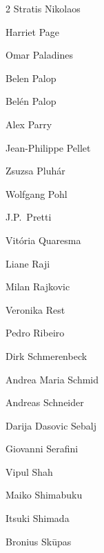 \begin{multicols}{2}
 \ifdefined\AuthorNikolaosStratis {} Stratis Nikolaos\fi
 
 \ifdefined\AuthorPageHarriet {} Harriet Page\fi
 
 \ifdefined\AuthorPaladinesOmar {} Omar Paladines\fi
 
 \ifdefined\AuthorPalopBelen {} Belen Palop\fi
 
 \ifdefined\AuthorPalopBelen {} Belén Palop\fi
 
 \ifdefined\AuthorParryAlex {} Alex Parry\fi
 
 \ifdefined\AuthorPelletJeanPhilippe {} Jean-Philippe Pellet\fi
 
 \ifdefined\AuthorPluharZsuzsa {} Zsuzsa Pluhár\fi
 
 \ifdefined\AuthorPohlWolfgang {} Wolfgang Pohl\fi
 
 \ifdefined\AuthorPrettiJP {} J.P.~Pretti\fi
 
 \ifdefined\AuthorQuaresmaVitoria {} Vitória Quaresma\fi
 
 \ifdefined\AuthorRajiLiane {} Liane Raji\fi
 
 \ifdefined\AuthorRajkovicMilan {} Milan Rajkovic\fi
 
 \ifdefined\AuthorRestVeronika {} Veronika Rest\fi
 
 \ifdefined\AuthorRibeiroPedro {} Pedro Ribeiro\fi
 
 \ifdefined\AuthorSchmerenbeckDirk {} Dirk Schmerenbeck\fi
 
 \ifdefined\AuthorSchmidMariaAndrea {} Andrea Maria Schmid\fi
 
 \ifdefined\AuthorSchneiderAndreas {} Andreas Schneider\fi
 
 \ifdefined\AuthorSebaljDasovicDarija {} Darija Dasovic Sebalj\fi
 
 \ifdefined\AuthorSerafiniGiovanni {} Giovanni Serafini\fi
 
 \ifdefined\AuthorShahVipul {} Vipul Shah\fi
 
 \ifdefined\AuthorShimabukuMaiko {} Maiko Shimabuku\fi
 
 \ifdefined\AuthorShimadaItsuki {} Itsuki Shimada\fi
 
 \ifdefined\AuthorSkupasBronius {} Bronius Skūpas\fi
 

\end{multicols}
